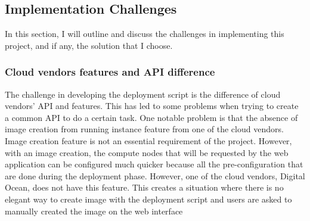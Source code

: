 \subsection{Implementation Challenges}


In this section, I will outline and discuss the challenges in implementing this project, and if any, the solution that I choose.

\subsubsection{Cloud vendors features and API difference}

The challenge in developing the deployment script is the difference of cloud vendors' API and features.  This has led to some problems when trying to create a common API to do a certain task. One notable problem is that the absence of image creation from running instance feature from one of the cloud vendors. Image creation feature is not an essential requirement of the project. However, with an image creation, the compute nodes that will be requested by the web application can be configured much quicker because all the pre-configuration that are done during the deployment phase. However, one of the cloud vendors, Digital Ocean, does not have this feature. This creates a situation where there is no elegant way to create image with the deployment script and users are asked to manually created the image on the web interface

\vspace{1cm}

\noindent%
\begin{minipage}{\linewidth}%
\label{fig:hemeweb-challenge-1}%
\end{minipage}

